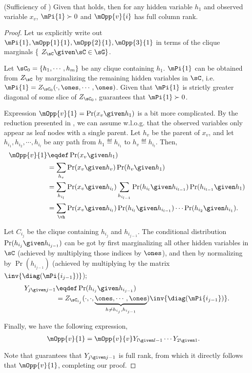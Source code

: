\begin{lemma}(Sufficiency of )
  Given that  holds, then for any hidden
  variable $h_1$ and observed variable $x_v$, $\mPi{1} \succ 0$ and
  $\mOpp{v}{i}$ has full column rank.
\end{lemma}

\begin{proof}
Let us explicitly write out $\mPi{1}, \mOpp{1}{1}, \mOpp{2}{1},
\mOpp{3}{1}$ in terms of the clique marginals \{ $Z_\sC \given \sC \in \sG \}$.

Let $\sC_0 = \{h_1, \cdots, h_m\}$ be any clique containing
  $h_1$. $\mPi{1}$ can be obtained from $Z_\sC$ by marginalizing the
  remaining hidden variables in $\sC$, i.e. $\mPi{1} = Z_{\sC_0}(\cdot,
  \ones, \cdots, \ones)$.
Given that $\mPi{1}$ is strictly greater diagonal of some slice of $Z_{\sC_0}$,
   guarantees that $\mPi{1} \succ 0$.

Expression $\mOpp{v}{1} = \Pr(x_v \given h_1)$ is a bit more
  complicated. 
By the reduction presented in , we can assume
  w.l.o.g. that the observed variables only appear as leaf nodes with
  a single parent. 
Let $h_v$ be the parent of $x_v$, and let $h_{i_1}, h_{i_2}, \cdots, h_{i_l}$ be any
  path from $h_1 \eqdef h_{i_1}$ to $h_v \eqdef h_{i_l}$.
Then,
\begin{align*}
  \mOpp{v}{1} &\eqdef \Pr( x_v \given h_1 )  \\
              &= \sum_{h_v} \Pr( x_v \given h_v ) \Pr( h_v \given h_1 ) \\
              &= \sum_{h_{i_l}} \Pr( x_v \given h_{i_l} ) \sum_{h_{i_{l-1}}} \Pr( h_{i_{l}} \given h_{i_{l-1}} ) \Pr( h_{i_{l-1}} \given h_1 ) \\
              &= \sum_{\vh} \Pr( x_v \given h_{i_l} ) \Pr( h_{i_{l}} \given
              h_{i_{l-1}} ) \cdots \Pr( h_{i_2} \given h_{i_1} ).
\end{align*}

Let $C_{i_j}$ be the clique containing $h_{i_j}$ and $h_{i_{j-1}}$. 
The conditional distribution $\Pr( h_{i_j} \given h_{i_{j-1}} )$ can be
  got by first marginalizing all other hidden variables in $\sC$ (achieved by
  multiplying those indices by $\ones$), and then by normalizing by $\Pr(h_{i_{j-1}})$ (achieved by multiplying by the matrix $\inv{\diag(\mPi{i_{j-1}})}$); 
\begin{align*}
  Y_{j \given j-1} 
    &\eqdef \Pr( h_{i_j} \given h_{i_{j-1}} ) \\
    &= Z_{\sC_{i_j}}(\cdot, \cdot, \underbrace{\ones, \cdots, \ones}_{h \neq h_{i_j}, h_{i_{j-1}}})
        \inv{\diag(\mPi{i_{j-1}})}.
\end{align*}

Finally, we have the following expression,
\begin{align*}
  \mOpp{v}{1} &= \mOpp{v}{v} Y_{l \given l-1} \cdots Y_{2 \given 1}.
\end{align*}

Note that  guarantees that $Y_{j \given
  j -1}$ is full rank, from which it directly follows that $\mOpp{v}{1}$, completing our proof.
\end{proof}
